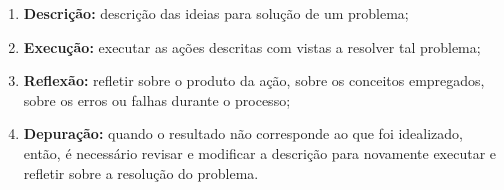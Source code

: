 \begin{enumerate}
	\item \textbf{Descrição:} descrição das ideias para solução de um problema;
	\item \textbf{Execução:} executar as ações descritas com vistas a resolver tal problema;
	\item \textbf{Reflexão:} refletir sobre o produto da ação, sobre os conceitos empregados, sobre os erros ou falhas durante o processo;
	\item \textbf{Depuração:} quando o resultado não corresponde ao que foi idealizado, então, é necessário revisar e modificar a descrição para novamente executar e refletir sobre a resolução do problema.
\end{enumerate}  





